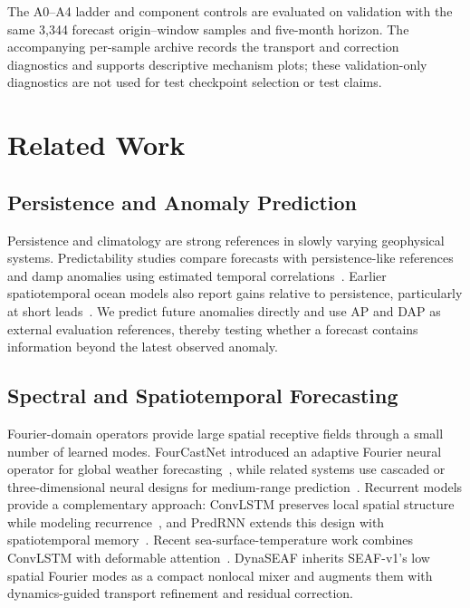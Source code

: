 \documentclass[conference]{IEEEtran}
\begin{document}
The A0--A4 ladder and component controls are evaluated on validation with the same 3,344 forecast origin--window samples and five-month horizon. The accompanying per-sample archive records the transport and correction diagnostics and supports descriptive mechanism plots; these validation-only diagnostics are not used for test checkpoint selection or test claims.

\section{Related Work}

\subsection{Persistence and Anomaly Prediction}
Persistence and climatology are strong references in slowly varying geophysical systems. Predictability studies compare forecasts with persistence-like references and damp anomalies using estimated temporal correlations~\cite{jacox2019dampedpersistence}. Earlier spatiotemporal ocean models also report gains relative to persistence, particularly at short leads~\cite{xiaoSpatiotemporalDeepLearning2019}. We predict future anomalies directly and use AP and DAP as external evaluation references, thereby testing whether a forecast contains information beyond the latest observed anomaly.

\subsection{Spectral and Spatiotemporal Forecasting}
Fourier-domain operators provide large spatial receptive fields through a small number of learned modes. FourCastNet introduced an adaptive Fourier neural operator for global weather forecasting~\cite{pathak2022fourcastnet}, while related systems use cascaded or three-dimensional neural designs for medium-range prediction~\cite{chen2023fuxi,bi2023accurate}. Recurrent models provide a complementary approach: ConvLSTM preserves local spatial structure while modeling recurrence~\cite{shiConvolutionalLSTMNetwork2015}, and PredRNN extends this design with spatiotemporal memory~\cite{wangPredRNNRecurrentNeural2017}. Recent sea-surface-temperature work combines ConvLSTM with deformable attention~\cite{shiSeaSurfaceTemperature2024}. DynaSEAF inherits SEAF-v1's low spatial Fourier modes as a compact nonlocal mixer and augments them with dynamics-guided transport refinement and residual correction.
\end{document}
